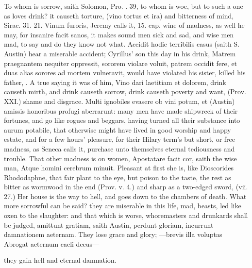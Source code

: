{To whom is sorrow, saith Solomon, Pro. . 39, to whom is woe, but
to such a one as loves drink? it causeth torture, (vino tortus et ira)
and bitterness of mind, Sirac. 31. 21. Vinum furoris, Jeremy calls it,
15. cap. wine of madness, as well he may, for insanire facit sanos, it
makes sound men sick and sad, and wise men mad, to say and do
they know not what. Accidit hodie terribilis casus (saith S.
Austin) hear a miserable accident; Cyrillus' son this day in his drink,
Matrem praegnantem nequiter oppressit, sororem violare voluit, patrem
occidit fere, et duas alias sorores ad mortem vulneravit, would have
violated his sister, killed his father, \etc{}. A true saying it was of
him, Vino dari laetitiam et dolorem, drink causeth mirth, and drink
causeth sorrow, drink causeth poverty and want, (Prov. XXI.) shame and
disgrace. Multi ignobiles evasere ob vini potum, et (Austin) amissis
honoribus profugi aberrarunt: many men have made shipwreck of their
fortunes, and go like rogues and beggars, having turned all their
substance into aurum potabile, that otherwise might have lived in good
worship and happy estate, and for a few hours' pleasure, for their
Hilary term's but short, or free madness, as Seneca calls it,
purchase unto themselves eternal tediousness and trouble.
That other madness is on women, Apostatare facit cor, saith the wise
man, Atque homini cerebrum minuit. Pleasant at first she is, like
Dioscorides Rhododaphne, that fair plant to the eye, but poison to the
taste, the rest as bitter as wormwood in the end (Prov. v. 4.) and
sharp as a two-edged sword, (vii. 27.) Her house is the way to hell,
and goes down to the chambers of death. What more sorrowful can be
said? they are miserable in this life, mad, beasts, led like oxen
to the slaughter: and that which is worse, whoremasters and drunkards
shall be judged, amittunt gratiam, saith Austin, perdunt gloriam,
incurrunt damnationem aeternam. They lose grace and glory;
---brevis illa voluptas
Abrogat aeternum caeli decus---

they gain hell and eternal damnation.

}

